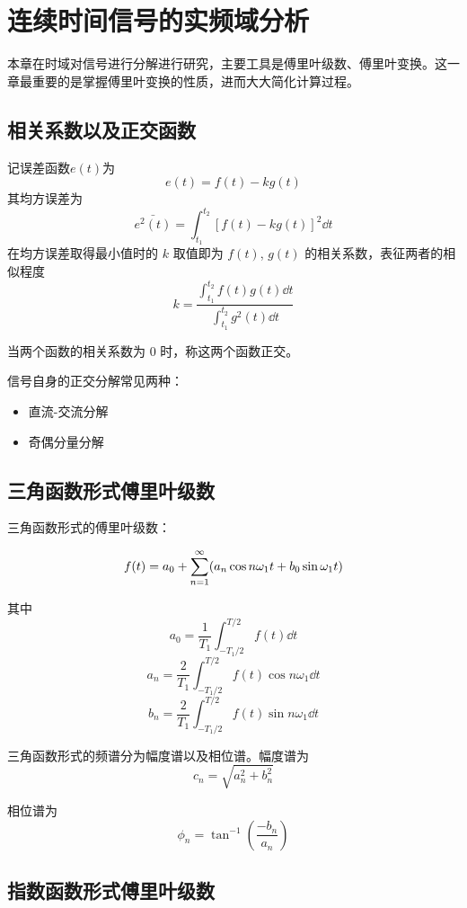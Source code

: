 \documentclass[cn,11pt,chinese,black,simple]{../elegantbook}
\begin{document}
\fi 



\chapter{连续时间信号的实频域分析}

本章在时域对信号进行分解进行研究，主要工具是傅里叶级数、傅里叶变换。这一章最重要的是掌握傅里叶变换的性质，进而大大简化计算过程。

\section{相关系数以及正交函数}

\begin{definition}[相关系数]
  记误差函数\(e(t)\)为\[e(t) = f(t) - k g(t)\]
  其均方误差为\[\bar{e^2(t)} = \int_{t_1}^{t_2}[f(t)-k g(t)]^2 \dd{t}\]
  在均方误差取得最小值时的 \(k\) 取值即为 \(f(t)\), \(g(t)\) 的相关系数，表征两者的相似程度
  \[k = \dfrac{\int_{t_1}^{t_2} f(t) g(t) \dd{t}}{\int_{t_1}^{t_2} g^2(t) \dd{t}}\]
\end{definition}

当两个函数的相关系数为 \(0\) 时，称这两个函数正交。

信号自身的正交分解常见两种：

\begin{itemize}
  \item 直流-交流分解 
  \item 奇偶分量分解
\end{itemize}

\section{三角函数形式傅里叶级数}

三角函数形式的傅里叶级数：

\[f(t) = a_0 + \displaystyle\sum_{n=1}^{\infty} (a_n \cos n\omega_1 t + b_0 \sin \omega_1 t)\]

其中
\[a_0 = \dfrac{1}{T_1} \int_{-T_1/2}^{T/2} f(t) \dd{t}\]
\[a_n = \dfrac{2}{T_1} \int_{-T_1/2}^{T/2} f(t) \cos n \omega_1 \dd{t}\]
\[b_n = \dfrac{2}{T_1} \int_{-T_1/2}^{T/2} f(t) \sin n \omega_1 \dd{t}\]

三角函数形式的频谱分为幅度谱以及相位谱。幅度谱为
\[c_n = \sqrt{a_n^2 + b_n^2}\]

相位谱为
\[\phi_n = \tan^{-1}\left(\dfrac{-b_n}{a_n}\right)\]

\section{指数函数形式傅里叶级数}
\end{document}
